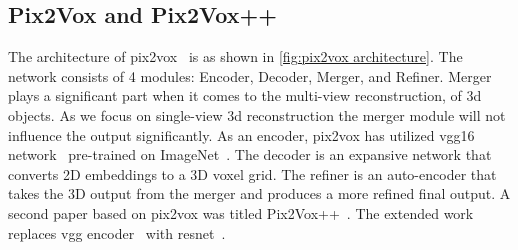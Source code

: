 \subsection{Pix2Vox and Pix2Vox++}\label{subsec:pix2vox-and-pix2vox++}
The architecture of pix2vox~\cite{Xie_2019} is as shown in \autoref{fig:pix2vox architecture}.
The network consists of 4 modules: Encoder, Decoder, Merger, and Refiner.
Merger plays a significant part when it comes to the multi-view reconstruction, of 3d objects.
As we focus on single-view 3d reconstruction the merger module will not influence the output significantly.
As an encoder, pix2vox has utilized \gls{vgg}16 network~\cite{simonyan2015deep} pre-trained on ImageNet~\cite{Deng2009ImageNetAL}.
The decoder is an expansive network that converts 2D embeddings to a 3D voxel grid.
The refiner is an auto-encoder that takes the 3D output from the merger and produces a more refined final output.
A second paper based on pix2vox was titled Pix2Vox++~\cite{Xie_2020}.
The extended work replaces \gls{vgg} encoder~\cite{simonyan2015deep} with \gls{resnet}~\cite{He2016DeepRL}.

